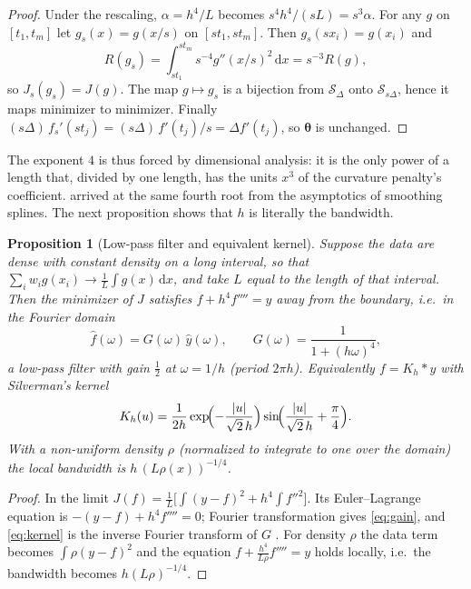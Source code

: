 \documentclass[11pt,a4paper]{article}
\newtheorem{proposition}[theorem]{Proposition}
\theoremstyle{definition}
\theoremstyle{remark}
\newcommand{\vth}{\boldsymbol{\theta}}
\newcommand{\Sd}{\mathcal{S}_\Delta}
\newcommand{\dd}{\,\mathrm{d}}
\begin{document}
\begin{proof}
Under the rescaling, $\alpha=h^4/L$ becomes $s^4h^4/(sL)=s^3\alpha$. For any $g$ on $[t_1,t_m]$ let $g_s(x)=g(x/s)$ on $[st_1,st_m]$. Then $g_s(sx_i)=g(x_i)$ and
\[
R(g_s)=\int_{st_1}^{st_m}s^{-4}g''(x/s)^2\dd x=s^{-3}R(g),
\]
so $J_s(g_s)=J(g)$. The map $g\mapsto g_s$ is a bijection from $\Sd$ onto $\mathcal S_{s\Delta}$, hence it maps minimizer to minimizer. Finally $(s\Delta)\,f_s'(st_j)=(s\Delta)\,f'(t_j)/s=\Delta f'(t_j)$, so $\vth$ is unchanged.
\end{proof}

The exponent $4$ is thus forced by dimensional analysis: it is the only power of a length that, divided by one length, has the units $x^3$ of the curvature penalty's coefficient. \citet{Silverman1984} arrived at the same fourth root from the asymptotics of smoothing splines. The next proposition shows that $h$ is literally the bandwidth.

\begin{proposition}[Low-pass filter and equivalent kernel]
\label{prop:kernel}
Suppose the data are dense with constant density on a long interval, so that $\sum_iw_ig(x_i)\to\frac1L\int g(x)\dd x$, and take $L$ equal to the length of that interval. Then the minimizer of $J$ satisfies $f+h^4f''''=y$ away from the boundary, i.e.\ in the Fourier domain
\begin{equation}
\label{eq:gain}
\hat f(\omega)=G(\omega)\,\hat y(\omega),\qquad G(\omega)=\frac{1}{1+(h\omega)^4},
\end{equation}
a low-pass filter with gain $\tfrac12$ at $\omega=1/h$ (period $2\pi h$). Equivalently $f=K_h*y$ with Silverman's kernel
\begin{equation}
\label{eq:kernel}
K_h(u)=\frac{1}{2h}\exp\!\Bigl(-\frac{|u|}{\sqrt2\,h}\Bigr)\sin\!\Bigl(\frac{|u|}{\sqrt2\,h}+\frac{\pi}{4}\Bigr).
\end{equation}
With a non-uniform density $\rho$ (normalized to integrate to one over the domain) the local bandwidth is $h\,(L\rho(x))^{-1/4}$.
\end{proposition}

\begin{proof}
In the limit $J(f)=\frac1L\bigl[\int(y-f)^2+h^4\int f''^2\bigr]$. Its Euler--Lagrange equation is $-(y-f)+h^4f''''=0$; Fourier transformation gives \eqref{eq:gain}, and \eqref{eq:kernel} is the inverse Fourier transform of $G$ \citep{Silverman1984}. For density $\rho$ the data term becomes $\int\rho(y-f)^2$ and the equation $f+\frac{h^4}{L\rho}f''''=y$ holds locally, i.e.\ the bandwidth becomes $h(L\rho)^{-1/4}$.
\end{proof}
\end{document}

